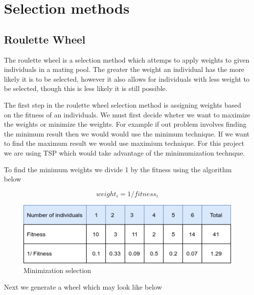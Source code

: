 \section{Selection methods}

\subsection{Roulette Wheel}

The roulette wheel is a selection method which attemps to apply weights to given individuals in a mating pool. The greater the weight an individual has the more likely it is to be selected, however it also allows for individuals with less weight to be selected, though this is less likely it is still possible.

The first step in the roulette wheel selection method is assigning weights based on the fitness of an individuals. We must first decide wheter we want to maximize the weights or minimize the weights. For example if out problem involves finding the minimum result then we would would use the minimum technique. If we want to find the maximum result we would use maximium technique. For this project we are using TSP which would take advantage of the minimumization technque. 

To find the minimum weights we divide 1 by the fitness using the algorithm below

\begin{equation}\label{eq:original-formula}
weight_i = 1 / fitness_i
\end{equation}

\begin{figure}[h!]
\vspace{-5pt}
\centering
\includegraphics[width=1.0\textwidth]{images/roulette-wheel-1.png}
\caption{\label{fig:3col_graph}Minimization selection}
\end{figure}

Next we generate a wheel which may look like below


